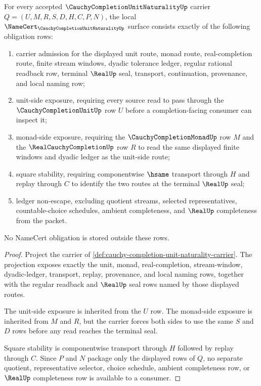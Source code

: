 \begin{theorem}
\label{thm:cauchy-completion-unit-naturality-namecert-obligations}
For every accepted $\CauchyCompletionUnitNaturalityUp$ carrier $Q=(U,M,R,S,D,H,C,P,N)$, the local $\NameCert_{\CauchyCompletionUnitNaturalityUp}$ surface consists exactly of the following obligation rows:
\begin{enumerate}
\item carrier admission for the displayed unit route, monad route, real-completion route, finite stream windows, dyadic tolerance ledger, regular rational readback row, terminal $\RealUp$ seal, transport, continuation, provenance, and local naming row;
\item unit-side exposure, requiring every source read to pass through the $\CauchyCompletionUnitUp$ row $U$ before a completion-facing consumer can inspect it;
\item monad-side exposure, requiring the $\CauchyCompletionMonadUp$ row $M$ and the $\RealCauchyCompletionUp$ row $R$ to read the same displayed finite windows and dyadic ledger as the unit-side route;
\item square stability, requiring componentwise $\hsame$ transport through $H$ and replay through $C$ to identify the two routes at the terminal $\RealUp$ seal;
\item ledger non-escape, excluding quotient streams, selected representatives, countable-choice schedules, ambient completeness, and $\RealUp$ completeness from the packet.
\end{enumerate}
No NameCert obligation is stored outside these rows.
\end{theorem}
\begin{proof}
Project the carrier of \autoref{def:cauchy-completion-unit-naturality-carrier}. The projection exposes exactly the unit, monad, real-completion, stream-window, dyadic-ledger, transport, replay, provenance, and local naming rows, together with the regular readback and $\RealUp$ seal rows named by those displayed routes.

The unit-side exposure is inherited from the $U$ row. The monad-side exposure is inherited from $M$ and $R$, but the carrier forces both sides to use the same $S$ and $D$ rows before any read reaches the terminal seal.

Square stability is componentwise transport through $H$ followed by replay through $C$. Since $P$ and $N$ package only the displayed rows of $Q$, no separate quotient, representative selector, choice schedule, ambient completeness row, or $\RealUp$ completeness row is available to a consumer.
\end{proof}

